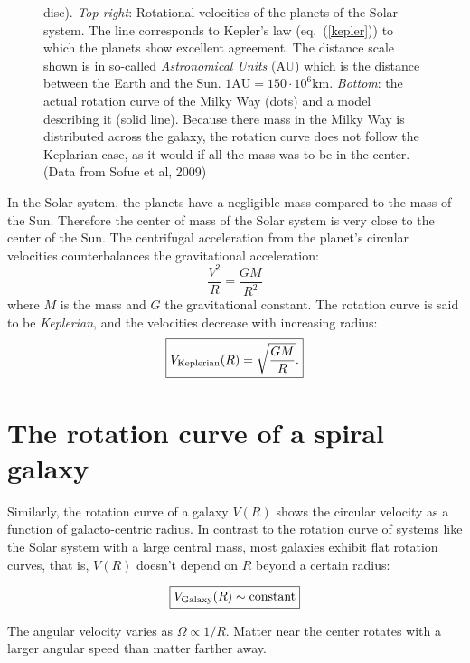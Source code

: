 \begin{figure}[htbp]
{  disc). \emph{Top right}: Rotational velocities of the planets of the
  Solar system. The line corresponds to Kepler's law
  (eq.~(\ref{kepler})) to which the planets show excellent agreement.
  The distance scale shown is in so-called \emph{Astronomical Units}
  (AU) which is the distance between the Earth and the Sun. $1
  \text{AU}=150\cdot 10^6 \text{km}$. \emph{Bottom}: the actual
  rotation curve of the Milky Way (dots) and a model describing it
  (solid line). Because there mass in the Milky Way is distributed
  across the galaxy, the rotation curve does not follow the Keplarian
  case, as it would if all the mass was to be in the center.(Data from Sofue et al, 2009) }
\label{rotcurve}
\end{figure}  

In the Solar system, the planets have a negligible mass compared to
the mass of the Sun. Therefore the center of mass of the Solar system
is very close to the center of the Sun. The centrifugal acceleration
from the planet's circular velocities counterbalances the
gravitational acceleration:
\begin{equation}
\frac{V^2}{R}= \frac{GM}{R^2}
\end{equation}
where $M$ is the mass and $G$ the gravitational constant.  The
rotation curve is said to be {\em Keplerian}, and the velocities
decrease with increasing radius:
\begin{equation}
\boxed{V_{\rm Keplerian}(R) = \sqrt{\frac{GM}{R}}.}
\label{kepler}
\end{equation}

\section{The rotation curve of a spiral galaxy}

Similarly, the rotation curve of a galaxy $V(R)$ shows the circular
velocity as a function of galacto-centric radius.  In contrast to the
rotation curve of systems like the Solar system with a large central
mass, most galaxies exhibit flat rotation curves, that is, $V(R)$
doesn't depend on $R$ beyond a certain radius:

\begin{equation}
\boxed{V_{\rm Galaxy}(R) \sim {\rm constant}}
\end{equation}

The angular velocity varies as $\Omega \propto 1/R$. Matter near the
center rotates with a larger angular speed than matter farther away.

